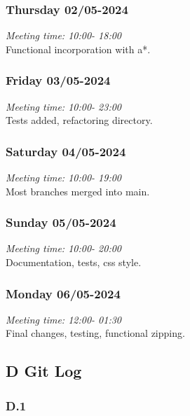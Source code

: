 \hypertarget{thursday-0205-2024}{%
\subsubsection*{Thursday 02/05-2024}\label{thursday-0205-2024}}

\emph{Meeting time: 10:00- 18:00 }\\
Functional incorporation with a*.

\hypertarget{friday-0305-2024}{%
\subsubsection*{Friday 03/05-2024}\label{friday-0305-2024}}

\emph{Meeting time: 10:00- 23:00 }\\
Tests added, refactoring directory.

\hypertarget{saturday-0405-2024}{%
\subsubsection*{Saturday 04/05-2024}\label{saturday-0405-2024}}

\emph{Meeting time: 10:00- 19:00 }\\
Most branches merged into main.

\hypertarget{sunday-0505-2024}{%
\subsubsection*{Sunday 05/05-2024}\label{sunday-0505-2024}}

\emph{Meeting time: 10:00- 20:00 }\\
Documentation, tests, css style.

\hypertarget{monday-0605-2024}{%
\subsubsection*{Monday 06/05-2024}\label{monday-0605-2024}}

\emph{Meeting time: 12:00- 01:30 }\\
Final changes, testing, functional zipping.
\newpage
\subsection*{D Git Log}
\subsubsection*{D.1}

